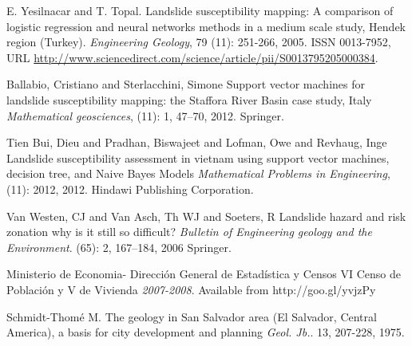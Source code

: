 \documentclass[11pt,twoside]{rmta2010esp}%
\begin{document}
\begin{thebibliography}{99}
E. Yesilnacar and T. Topal.
\newblock Landslide susceptibility mapping: A comparison of logistic regression and neural networks methods in a medium scale study, Hendek region (Turkey).
\newblock \emph{Engineering Geology}, 79
  (11): 251-266, 2005.
\newblock ISSN 0013-7952,
\newblock URL
  \url{http://www.sciencedirect.com/science/article/pii/S0013795205000384}.









Ballabio, Cristiano and Sterlacchini, Simone
\newblock Support vector machines for landslide susceptibility mapping: the Staffora River Basin case study, Italy
\newblock \emph{Mathematical geosciences},
  (11): 1, 47--70, 2012.
\newblock Springer. 



Tien Bui, Dieu and Pradhan, Biswajeet and Lofman, Owe and Revhaug, Inge
\newblock Landslide susceptibility assessment in vietnam using support vector machines, decision tree, and Naive Bayes Models
\newblock \emph{Mathematical Problems in Engineering},
  (11): 2012, 2012.
\newblock Hindawi Publishing Corporation.




Van Westen, CJ and Van Asch, Th WJ and Soeters, R
\newblock Landslide hazard and risk zonation why is it still so difficult?
\newblock \emph{Bulletin of Engineering geology and the Environment}.
(65): 2, 167--184, 2006
\newblock Springer. 





Ministerio de Economia- Direcci\'{o}n General de Estad\'{i}stica y Censos
\newblock VI Censo de Población y V de Vivienda
\newblock \emph{2007-2008}.
 Available from http://goo.gl/yvjzPy




Schmidt-Thom\'{e} M.
\newblock The geology in San Salvador area (El Salvador, Central America), a basis for city development and planning
\newblock \emph{Geol. Jb.}.
 13, 207-228, 1975.








\end{thebibliography}
\end{document}
